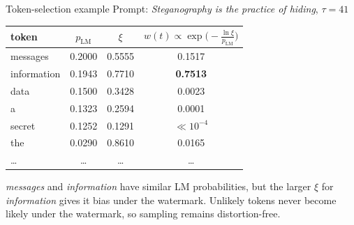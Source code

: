\begin{frame}{Token-selection example}
    \small
    Prompt: \emph{Steganography is the practice of hiding}, \(\tau=41\)~\cite{toller2025watermarking-notebook}

    \begin{center}
        \begin{tabular}{lccc}
            \textbf{token} & \(p_{\text{LM}}\) & \(\xi\) &
            \(w(t)\propto\exp\!\bigl(-\tfrac{\ln\xi}{p_{\text{LM}}}\bigr)\) \\\hline
            messages       & 0.2000            & 0.5555  & 0.1517           \\
            information    & 0.1943            & 0.7710  & \textbf{0.7513}  \\
            data           & 0.1500            & 0.3428  & 0.0023           \\
            a              & 0.1323            & 0.2594  & 0.0001           \\
            secret         & 0.1252            & 0.1291  & \(\ll 10^{-4}\)  \\
            the            & 0.0290            & 0.8610  & 0.0165           \\
            \dots          & \dots             & \dots   & \dots            \\
        \end{tabular}
    \end{center}

    \emph{messages} and \emph{information} have similar LM probabilities, but
    the larger \(\xi\) for \emph{information} gives it bias under
    the watermark. Unlikely tokens never become likely under the watermark, so sampling remains
    distortion-free.
\end{frame}
